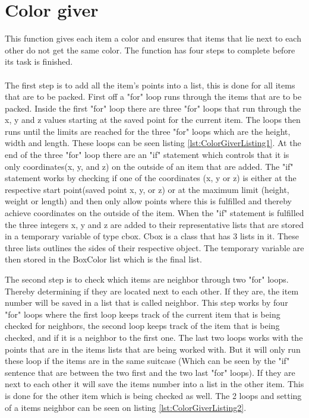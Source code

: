 \section{Color giver}
This function gives each item a color and ensures that items that lie next to each other do not get the same color. The function has four steps to complete before its task is finished.\\
\\
The first step is to add all the item's points into a list, this is done for all items that are to be packed. First off a "for" loop runs through the items that are to be packed. Inside the first "for" loop there are three "for" loops that run through the x, y and z values starting at the saved point for the current item. The loops then runs until the limits are reached for the three "for" loops which are the height, width and length. These loops can be seen listing \ref{lst:ColorGiverListing1}. At the end of the three "for" loop there are an "if" statement which controls that it is only coordinates(x, y, and z) on the outside of an item that are added. The "if" statement works by checking if one of the coordinates (x, y or z) is either at the respective start point(saved point x, y, or z) or at the maximum limit (height, weight or length) and then only allow points where this is fulfilled and thereby achieve coordinates on the outside of the item.
When the "if" statement is fulfilled the three integers x, y and z are added to their representative lists that are stored in a temporary variable of type cbox. Cbox is a class that has 3 lists in it. These three lists outlines the sides of their respective object. The temporary variable are then stored in the BoxColor list which is the final list.

The second step is to check which items are neighbor through two "for" loops. Thereby determining if they are located next to each other. If they are, the item number will be saved in a list that is called neighbor. This step works by four "for" loops where the first loop keeps track of the current item that is being checked for neighbors, the second loop keeps track of the item that is being checked, and if it is a neighbor to the first one. The last two loops works with the points that are in the items lists that are being worked with. But it will only run these loop if the items are in the same suitcase (Which can be seen by the "if" sentence that are between the two first and the two last "for" loops). If they are next to each other it will save the items number into a list in the other item. This is done for the other item which is being checked as well. The 2 loops and setting of a items neighbor can be seen on listing \ref{lst:ColorGiverListing2}.


